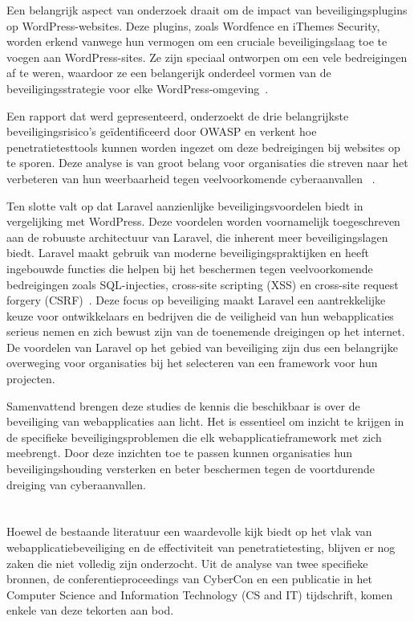 Een belangrijk aspect van onderzoek draait om de impact van beveiligingsplugins op WordPress-websites. Deze plugins, zoals Wordfence en iThemes Security, worden 
erkend vanwege hun vermogen om een cruciale beveiligingslaag toe te voegen aan WordPress-sites. Ze zijn speciaal ontworpen om een vele bedreigingen af 
te weren, waardoor ze een belangerijk onderdeel vormen van de beveiligingsstrategie voor elke WordPress-omgeving~\autocite{Casola2020}.

Een rapport dat werd gepresenteerd, onderzoekt de drie belangrijkste beveiligingsrisico's geïdentificeerd door OWASP en verkent hoe penetratietesttools kunnen 
worden ingezet om deze bedreigingen bij websites op te sporen. Deze analyse is van groot belang voor organisaties die streven naar het verbeteren van hun 
weerbaarheid tegen veelvoorkomende cyberaanvallen ~\autocite{Sharma2023}.

Ten slotte valt op dat Laravel aanzienlijke beveiligingsvoordelen biedt in vergelijking met WordPress. Deze voordelen worden voornamelijk toegeschreven aan 
de robuuste architectuur van Laravel, die inherent meer beveiligingslagen biedt. Laravel maakt gebruik van moderne beveiligingspraktijken en heeft ingebouwde 
functies die helpen bij het beschermen tegen veelvoorkomende bedreigingen zoals SQL-injecties, cross-site scripting (XSS) en cross-site request forgery (CSRF)~\autocite{Lebedeva2023}. Deze focus 
op beveiliging maakt Laravel een aantrekkelijke keuze voor ontwikkelaars en bedrijven die de veiligheid van hun webapplicaties serieus nemen en zich bewust 
zijn van de toenemende dreigingen op het internet. De voordelen van Laravel op het gebied van beveiliging zijn dus een belangrijke overweging voor organisaties 
bij het selecteren van een framework voor hun projecten.

Samenvattend brengen deze studies de kennis die beschikbaar is over de beveiliging van webapplicaties aan licht. 
Het is essentieel om inzicht te krijgen in de specifieke beveiligingsproblemen die elk webapplicatieframework met zich meebrengt. Door deze inzichten 
toe te passen kunnen organisaties hun beveiligingshouding versterken en beter beschermen tegen de voortdurende dreiging van cyberaanvallen.

\section{}
Hoewel de bestaande literatuur een waardevolle kijk biedt op het vlak van webapplicatiebeveiliging en de effectiviteit van penetratietesting, blijven er nog 
zaken die niet volledig zijn onderzocht. Uit de analyse van twee specifieke bronnen, de conferentieproceedings van CyberCon en een publicatie in het 
Computer Science and Information Technology (CS and IT) tijdschrift, komen enkele van deze tekorten aan bod.


